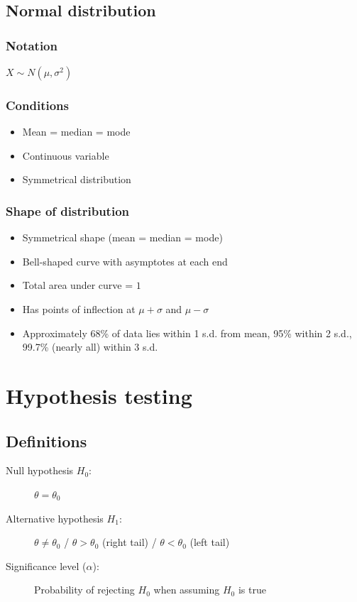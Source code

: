 \documentclass[A4paper, 11pt]{article}
\begin{document}
	\subsection{Normal distribution}
	\subsubsection{Notation}
	$X \sim N(\mu,\sigma^2)$
	\subsubsection{Conditions}
	\begin{itemize}
		\item Mean = median = mode
		\item Continuous variable
		\item Symmetrical distribution
	\end{itemize}
	\subsubsection{Shape of distribution}
	\begin{itemize}
		\item Symmetrical shape (mean = median = mode)
		\item Bell-shaped curve with asymptotes at each end
		\item Total area under curve = $1$
		\item Has points of inflection at $\mu+\sigma$ and $\mu-\sigma$
		\item Approximately 68\% of data lies within 1 s.d. from mean, 95\% within 2 s.d., 99.7\% (nearly all) within 3 s.d.
	\end{itemize}
	
	\pagebreak
	
	
	\section{Hypothesis testing}
	\subsection{Definitions}
	\begin{description}
		\item[Null hypothesis $H_0$:] $\theta=\theta_0$
		\item[Alternative hypothesis $H_1$:] $\theta \neq \theta_0$ / $\theta>\theta_0$ (right tail) / $\theta<\theta_0$ (left tail)
		\item[Significance level ($\alpha$):] Probability of rejecting $H_0$ when assuming $H_0$ is true
	\end{description}
	
\end{document}
